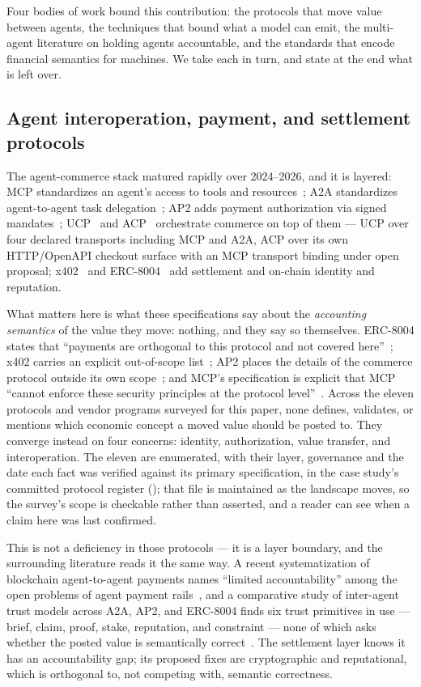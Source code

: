 \documentclass[11pt]{clapps}  %
\begin{document}
Four bodies of work bound this contribution: the protocols that move value
between agents, the techniques that bound what a model can emit, the multi-agent
literature on holding agents accountable, and the standards that encode
financial semantics for machines. We take each in turn, and state at the end
what is left over.

\subsection{Agent interoperation, payment, and settlement protocols}

The agent-commerce stack matured rapidly over 2024--2026, and it is layered:
MCP standardizes an agent's access to tools and resources~\cite{mcp_spec}; A2A
standardizes agent-to-agent task delegation~\cite{a2a_spec}; AP2 adds payment
authorization via signed mandates~\cite{ap2_spec}; UCP~\cite{ucp_spec} and
ACP~\cite{acp_spec} orchestrate commerce on top of them --- UCP over four
declared transports including MCP and A2A, ACP over its own HTTP/OpenAPI
checkout surface with an MCP transport binding under open proposal;
x402~\cite{x402_spec} and ERC-8004~\cite{erc8004} add settlement and on-chain
identity and reputation.

What matters here is what these specifications say about the \emph{accounting
semantics} of the value they move: nothing, and they say so themselves.
ERC-8004 states that ``payments are orthogonal to this protocol and not covered
here''~\cite{erc8004}; x402 carries an explicit out-of-scope
list~\cite{x402_spec}; AP2 places the details of the commerce protocol outside
its own scope~\cite{ap2_spec}; and MCP's specification is explicit that MCP
``cannot enforce these security principles at the protocol
level''~\cite{mcp_spec}. Across the eleven protocols and vendor programs
surveyed for this paper, none defines, validates, or mentions which economic
concept a moved value should be posted to. They converge instead on four
concerns: identity, authorization, value transfer, and interoperation. The
eleven are enumerated, with their layer, governance and the date each fact was
verified against its primary specification, in the case study's committed
protocol register ();
that file is maintained as the landscape moves, so the survey's scope is
checkable rather than asserted, and a reader can see when a claim here was last
confirmed.

This is not a deficiency in those protocols --- it is a layer boundary, and the
surrounding literature reads it the same way. A recent systematization of
blockchain agent-to-agent payments names ``limited accountability'' among the
open problems of agent payment rails~\cite{zhang2026sok}, and a comparative
study of inter-agent trust models across A2A, AP2, and ERC-8004 finds six trust
primitives in use --- brief, claim, proof, stake, reputation, and constraint ---
none of which asks whether the posted value is semantically
correct~\cite{hu2025interagenttrust}. The settlement layer knows it has an
accountability gap; its proposed fixes are cryptographic and reputational, which
is orthogonal to, not competing with, semantic correctness.
\end{document}
